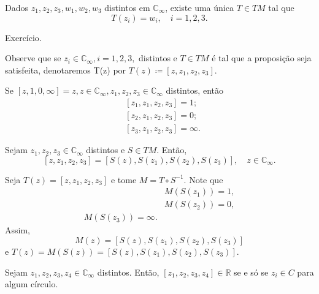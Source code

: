 \documentclass[ComplexAnalysis/complex.tex]{subfiles}
\begin{document}
\begin{crl*}
	Dados $z_1, z_2, z_3, w_1, w_2, w_3$ distintos em $\mathbb{C}_{\infty}$, existe uma única $T\in{TM}$ tal que
	$$
		T(z_{i}) = w_{i}, \quad i=1, 2, 3.
	$$
\end{crl*}
\begin{proof*}
	Exercício. \qedsymbol
\end{proof*}
Observe que se $z_{i}\in \mathbb{C}_{\infty}, i = 1, 2, 3,$ distintos e $T\in{TM}$ é tal que a proposição
seja satisfeita, denotaremos T(z) por  $T(z) \coloneqq  [z, z_1, z_2, z_3].$
\begin{example}
	Se $[z, 1, 0, \infty] = z, z\in \mathbb{C}_{\infty}, z_1, z_2, z_3\in \mathbb{C}_{\infty}$ distintos, então
	\begin{align*}
		 & [z_1, z_1, z_2, z_3] = 1;      \\
		 & [z_2, z_1, z_2, z_3] = 0;      \\
		 & [z_3, z_1, z_2, z_3] = \infty.
	\end{align*}
\end{example}
\begin{prop*}
	Sejam $z_1, z_2, z_3\in \mathbb{C}_{\infty}$ distintos e $S\in{TM}.$ Então,
	$$
		[z, z_1, z_2, z_3] = [S(z), S(z_1), S(z_2), S(z_3)], \quad z\in \mathbb{C}_{\infty}.
	$$
\end{prop*}
\begin{proof*}
	Seja $T(z) = [z, z_1, z_2, z_3]$ e tome $M = T\circ{S^{-1}}.$ Note que
	\begin{align*}
		 & M(S(z_1)) = 1, \\
		 & M(S(z_2)) = 0, \\
		M(S(z_3)) = \infty.
	\end{align*}
	Assim,
	$$
		M(z) = [S(z), S(z_1), S(z_2), S(z_3)]
	$$
	e $T(z) = M(S(z)) = [S(z), S(z_1), S(z_2), S(z_3)]$. \qedsymbol
\end{proof*}
\begin{prop*}
	Sejam $z_1, z_2, z_3, z_4\in \mathbb{C}_{\infty}$ distintos. Então, $[z_1, z_2, z_3, z_4]\in \mathbb{R}$ se e só se
	$z_{i}\in{C}$ para algum círculo.
\end{prop*}
\end{document}
